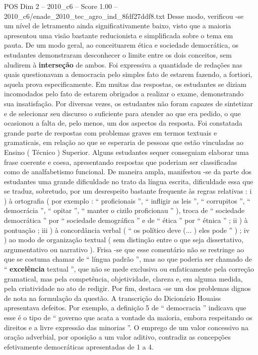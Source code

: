 \begin{textsample}{POS Dim 2 – 2010\_c6 – Score 1.00 – 2010\_c6/enade\_2010\_tec\_agro\_ind\_8fdf27ddf8.txt}
Desse modo, verificou -se um nível de letramento ainda significativamente baixo, visto que a maioria apresentou uma visão bastante reducionista e simplificada sobre o tema em pauta.
De um modo geral, ao conceituarem ética e sociedade democrática, os estudantes demonstraram desconhecer o limite entre os dois conceitos, sem aludirem à \textbf{interseção} de ambos.
Foi expressiva a quantidade de redações nas quais questionavam a democracia pelo simples fato de estarem fazendo, a fortiori, aquela prova especificamente.
Em muitas das respostas, os estudantes se diziam incomodados pelo fato de estarem obrigados a realizar o exame, demonstrando sua insatisfação.
Por diversas vezes, os estudantes não foram capazes de sintetizar e de selecionar seu discurso o suficiente para atender ao que era pedido, o que ocasionou a falta de, pelo menos, um dos aspectos da resposta.
Foi constatada grande parte de respostas com problemas graves em termos textuais e gramaticais, em relação ao que se esperaria de pessoas que estão vinculadas ao Ensino ( Técnico ) Superior.
Alguns estudantes sequer conseguiam elaborar uma frase coerente e coesa, apresentando respostas que poderiam ser classificadas como de analfabetismo funcional.
De maneira ampla, manifestou -se da parte dos estudantes uma grande dificuldade no trato da língua escrita, dificuldade essa que se traduz, sobretudo, por um desrespeito bastante frequente às regras relativas : i ) à ortografia ( por exemplo : “ proficionais ”, “ infligir as leis ”, “ corrupitos ”, “ democrácia ”, “ opitar ”, “ manter o cizilo proficionau ” ), troca de “ sociedade democrática ” por “ sociedade demográfica ” e de “ ética ” por “ étnica ” ; ii ) à pontuação ; iii ) à concordância verbal ( “ os político deve (... ) eles pode ” ) ; iv ) ao modo de organização textual ( sem distinção entre o que seja dissertativo, argumentativo ou narrativo ).
Frisa -se que esse comentário não se restringe ao que se costuma chamar de “ língua padrão ”, mas ao que poderia ser chamado de “ \textbf{excelência} textual ”, que não se mede exclusiva ou enfaticamente pela correção gramatical, mas pela competência, objetividade, clareza e, em alguma medida, pela criatividade no ato de redigir.
Por fim, destaca -se um dos problemas dignos de nota na formulação da questão.
A transcrição do Dicionário Houaiss apresentava defeitos.
Por exemplo, a definição 5 de “ democracia ” indicava que esse é o tipo de “ governo que acata a vontade da maioria, embora respeitando os direitos e a livre expressão das minorias ”.
O emprego de um valor concessivo na oração adverbial, por oposição a um valor aditivo, contradiz as concepções efetivamente democráticas apresentadas de 1 a 4.

\end{textsample}
